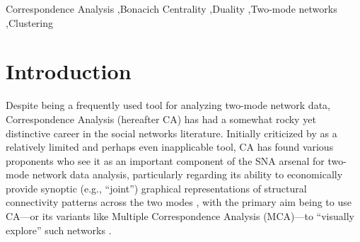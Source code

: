 \documentclass[a4paper,fleqn]{cas-sc}
\begin{document}
\begin{abstract}
This paper reconsiders the status of Correspondence Analysis (CA) as a tool for analyzing two-mode networks, comparing it with the Bonacich dual centrality approach and revealing the mathematical linkages between them as eigenvector-based methods. While Bonacich centrality identifies core-periphery structures and is helpful for clustering nodes based on the criterion of similarity via structural equivalence, CA is best at detecting subsets of actors and events based on a generalized relational similarity criterion, thus coming closer to clustering via regular equivalence. Ultimately, both CA and Bonacich centrality prove to be valuable yet distinct strategies for the dual projection analysis of two-mode networks, highlighting the duality between actors and events.
\end{abstract}



\begin{keywords}
Correspondence Analysis \sep Bonacich Centrality \sep Duality \sep Two-mode networks \sep Clustering 
\end{keywords}

\maketitle

\newpage
\section{Introduction} \label{sec:1intro}
Despite being a frequently used tool for analyzing two-mode network data, Correspondence Analysis (hereafter CA) has had a somewhat rocky yet distinctive career in the social networks literature. Initially criticized by \citet{borgatti1997network} as a relatively limited and perhaps even inapplicable tool, CA has found various proponents who see it as an important component of the SNA arsenal for two-mode network data analysis, particularly regarding its ability to economically provide synoptic (e.g., ``joint'') graphical representations of structural connectivity patterns across the two modes \citep{roberts2000correspondence, breiger2000tool, faust2005using}, with the primary aim being to use CA---or its variants like Multiple Correspondence Analysis (MCA)---to ``visually explore'' such networks \citep{desposito2014use}. 
\end{document}
